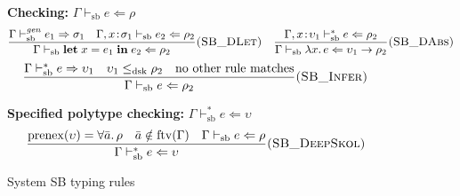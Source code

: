 \documentclass[11pt,a4paper]{article}
\begin{document}
\begin{figure}[p]
\vspace{1em}
\textbf{Checking:} $\boxed{\Gamma \vdash_{\mathrm{sb}} e \Leftarrow \rho}$
\[
\frac{\Gamma \vdash_{\mathrm{sb}}^{\mathit{gen}} e_1 \Rightarrow \sigma_1 \quad \Gamma, x\!:\!\sigma_1 \vdash_{\mathrm{sb}} e_2 \Leftarrow \rho_2}{\Gamma \vdash_{\mathrm{sb}} \mathbf{let}\; x = e_1 \;\mathbf{in}\; e_2 \Leftarrow \rho_2}\textsc{(SB\_DLet)}
\quad
\frac{\Gamma, x\!:\!\upsilon_1 \vdash_{\mathrm{sb}}^{*} e \Leftarrow \rho_2}{\Gamma \vdash_{\mathrm{sb}} \lambda x.\, e \Leftarrow \upsilon_1 \to \rho_2}\textsc{(SB\_DAbs)}
\]
\[
\frac{\Gamma \vdash_{\mathrm{sb}}^{*} e \Rightarrow \upsilon_1 \quad \upsilon_1 \leq_{\mathrm{dsk}} \rho_2 \quad \text{no other rule matches}}{\Gamma \vdash_{\mathrm{sb}} e \Leftarrow \rho_2}\textsc{(SB\_Infer)}
\]

\vspace{1em}
\textbf{Specified polytype checking:} $\boxed{\Gamma \vdash_{\mathrm{sb}}^{*} e \Leftarrow \upsilon}$
\[
\frac{\mathrm{prenex}(\upsilon) = \forall \bar{a}.\, \rho \quad \bar{a} \notin \mathrm{ftv}(\Gamma) \quad \Gamma \vdash_{\mathrm{sb}} e \Leftarrow \rho}{\Gamma \vdash_{\mathrm{sb}}^{*} e \Leftarrow \upsilon}\textsc{(SB\_DeepSkol)}
\]
\caption{System SB typing rules}
\label{fig:typing-rules}
\end{figure}
\end{document}
